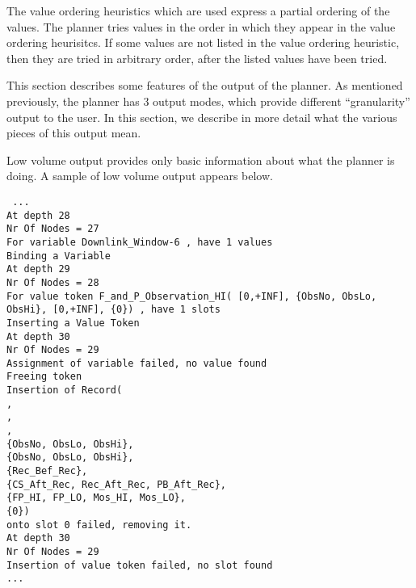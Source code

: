 The value ordering heuristics which are used express a partial
ordering of the values.  The planner tries values in the order in
which they appear in the value ordering heurisitcs.  If some values
are not listed in the value ordering heuristic, then they are tried in
arbitrary order, after the listed values have been tried.

This section describes some features of the output of the planner.  As mentioned previously,
the planner has 3 output modes, which provide different ``granularity'' output to the user.
In this section, we describe in more detail what the various pieces of this output mean.

Low volume output provides only basic information about what the planner is doing.
A sample of low volume output appears below.

{\tt
\noindent ...\\ 
At depth 28\\
Nr Of Nodes = 27\\
For variable Downlink\_Window-6 , have 1 values\\
Binding a Variable\\
At depth 29\\
Nr Of Nodes = 28\\
For value token F\_and\_P\_Observation\_HI( [0,+INF], \{ObsNo, ObsLo, ObsHi\}, [0,+INF], \{0\}) , have 1 slots\\
Inserting a Value Token\\
At depth 30\\
Nr Of Nodes = 29\\
Assignment of variable failed, no value found\\
Freeing token \\
Insertion of Record( \\
\indent [0,89964000], \\
\indent [0,90000000], \\
\indent [0,+INF], \\
\indent \{ObsNo, ObsLo, ObsHi\}, \\
\indent \{ObsNo, ObsLo, ObsHi\}, \\
\indent \{Rec\_Bef\_Rec\}, \\
\indent \{CS\_Aft\_Rec, Rec\_Aft\_Rec, PB\_Aft\_Rec\}, \\
\indent \{FP\_HI, FP\_LO, Mos\_HI, Mos\_LO\}, \\
\indent \{0\}) \\
onto slot 0 failed, removing it.\\
At depth 30\\
Nr Of Nodes = 29\\
Insertion of value token failed, no slot found\\
...
}

